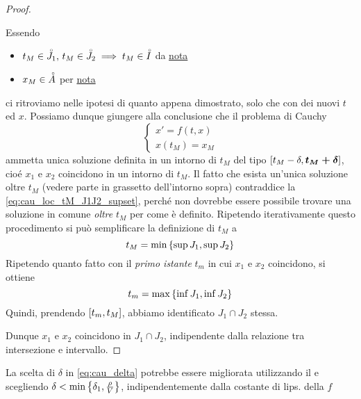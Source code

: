 \begin{theorem}
\begin{proof}
\begin{itemize}
				Essendo
				\begin{itemize}
					\item $t_M \in \accentset{\circ}{J_1},\,t_M \in \accentset{\circ}{J_2} \implies t_M \in \accentset{\circ}{I}$ da \hyperlink{note:diff_eq_sol_definit_set}{nota }
					\item $x_M \in \accentset{\circ}{A}$ per \hyperlink{def:equaz_diff_sol}{nota }
				\end{itemize}
				ci ritroviamo nelle ipotesi di quanto appena dimostrato, solo che con dei nuovi $t$ ed $x$. Possiamo dunque giungere alla conclusione che il problema di Cauchy
				\[\begin{cases}x'=f(t,x)\\x(t_M)=x_M\end{cases}\]
				ammetta unica soluzione definita in un intorno di $t_M$ del tipo $\left[t_M-\delta,\boldsymbol{t_M+\delta}\right]$, cioé $x_1$ e $x_2$ coincidono in un intorno di $t_M$. Il fatto che esista un'unica soluzione oltre $t_M$ (vedere parte in grassetto dell'intorno sopra) contraddice la \cref{eq:cau_loc_tM_J1J2_supset}, perché non dovrebbe essere possibile trovare una soluzione in comune \textit{oltre} $t_M$ per come è definito. Ripetendo iterativamente questo procedimento si può semplificare la definizione di $t_M$ a
				\[t_M = \min \left\{\sup J_1, \sup J_2\right\}\]
				Ripetendo quanto fatto con il \textit{primo istante} $t_m$ in cui $x_1$ e $x_2$ coincidono, si ottiene
				\[t_m = \max \left\{\inf J_1, \inf J_2\right\}\]
				Quindi, prendendo $\left[t_m,t_M\right]$, abbiamo identificato $J_1 \cap J_2$ stessa.
		\end{itemize}
		Dunque $x_1$ e $x_2$ coincidono in $J_1 \cap J_2$, indipendente dalla relazione tra intersezione e intervallo.
	\end{proof}
	\begin{note}
		La scelta di $\delta$ in \cref{eq:cau_delta} potrebbe essere migliorata utilizzando il  e scegliendo $\delta<\min\left\{\delta_1,\frac{\rho}{V}\right\}$, indipendentemente dalla costante di lips. della $f$
	\end{note}
\end{theorem}

